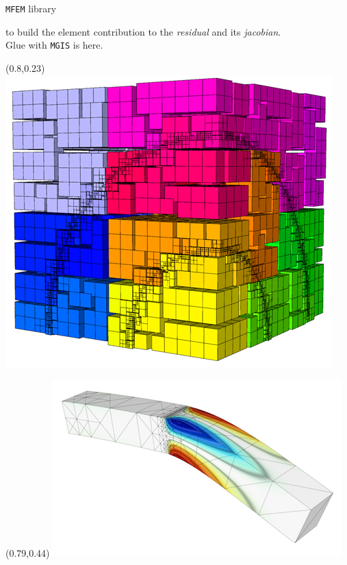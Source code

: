 \documentclass{beamer}
\begin{document}
\begin{frame}[fragile]{\texttt{MFEM} library}
\begin{itemize}
\begin{itemize}
    to build the element contribution to the \emph{residual} and its
    \emph{jacobian}.\\
    \hspace*{0.333em}\hspace*{0.333em}Glue with \texttt{MGIS} is here.
  \end{itemize}
\end{itemize}
\begin{textblock}{.15}(0.8,0.23)
    \includegraphics[width=\textwidth]{img/amr1.png}
\end{textblock}
\begin{textblock}{.19}(0.79,0.44)
    \includegraphics[width=\textwidth]{img/ex21.png}
\end{textblock}

\end{frame}
\end{document}
